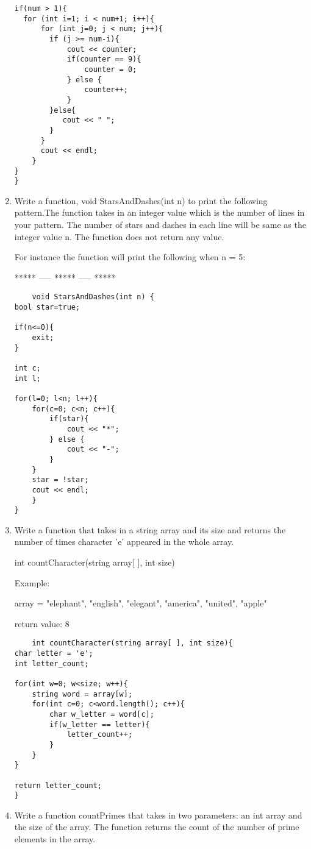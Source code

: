 \documentclass{article}
\begin{document}
\begin{enumerate}
\begin{lstlisting}
if(num > 1){
  for (int i=1; i < num+1; i++){
      for (int j=0; j < num; j++){
        if (j >= num-i){
            cout << counter;
            if(counter == 9){
                counter = 0;
            } else {
                counter++;
            }
        }else{
           cout << " ";
        }
      }
      cout << endl;
    }
}
}
\end{lstlisting}

\item Write a function, void StarsAndDashes(int n) to print the following pattern.The function takes in an integer value which is the number of lines in your pattern. The number of stars and dashes in each line will be same as the integer value n. The function does not return any value.

For instance the function will print the following when n = 5:

*****
-----
*****
-----
*****
\begin{lstlisting}
	void StarsAndDashes(int n) {
bool star=true;

if(n<=0){
    exit;
}

int c;
int l;

for(l=0; l<n; l++){
    for(c=0; c<n; c++){
        if(star){
            cout << "*";
        } else {
            cout << "-";
        }
    }
    star = !star;
    cout << endl;
    }
}
\end{lstlisting}
\item Write a function that takes in a string array and its size and returns the number of times character 'e' appeared in the whole array.

int countCharacter(string array[ ], int size)

Example:

array = {"elephant", "english", "elegant", "america", "united", "apple"}

return value: 8

\begin{lstlisting}
	int countCharacter(string array[ ], int size){
char letter = 'e';
int letter_count;

for(int w=0; w<size; w++){
    string word = array[w];
    for(int c=0; c<word.length(); c++){
        char w_letter = word[c];
        if(w_letter == letter){
            letter_count++;
        }
    }
}

return letter_count;
}
\end{lstlisting}
\item Write a function countPrimes that takes in two parameters: an int array and the size of the array. The function returns the count of the number of prime elements in the array.


\end{enumerate}
\end{document}
